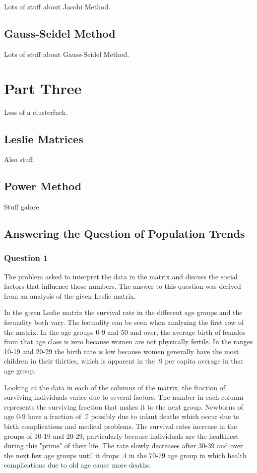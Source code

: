 \documentclass[letterpaper,11pt]{article}
\begin{document}
Lots of stuff about Jacobi Method.

\subsection{Gauss-Seidel Method}

Lots of stuff about Gauss-Seidel Method.

\newpage
\section{Part Three}

Less of a clusterfuck.

\subsection{Leslie Matrices}

Also stuff.

\subsection{Power Method}

Stuff galore.

\subsection{Answering the Question of Population Trends}

\subsubsection{Question 1}

The problem asked to interpret the data in the matrix and discuss the social factors that influence those numbers.
The answer to this question was derived from an analysis of the given Leslie matrix.

In the given Leslie matrix the survival rate in the different age groups and the fecundity both vary.
The fecundity can be seen when analyzing the first row of the matrix.
In the age groups 0-9 and 50 and over, the average birth of females from that age class is zero because women are not physically fertile.
In the ranges 10-19 and 20-29 the birth rate is low because women generally have the most children in their thirties,
which is apparent in the .9 per capita average in that age group. 

Looking at the data in each of the columns of the matrix, the fraction of surviving individuals varies due to several factors.
The number in each column represents the surviving fraction that makes it to the next group.
Newborns of age 0-9 have a fraction of .7 possibly due to infant deaths which occur due to birth complications and medical problems.
The survival rates increase in the groups of 10-19 and 20-29, particularly because individuals are the healthiest during this "prime"
of their life.
The rate slowly decreases after 30-39 and over the next few age groups until it drops .4 in the 70-79 age group in which health
complications due to old age cause more deaths.
\end{document}
